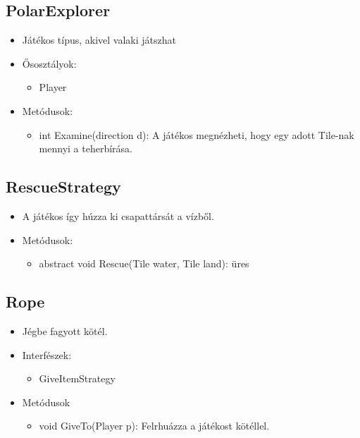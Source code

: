 \subsection{PolarExplorer}
\begin{itemize}
	\item Játékos típus, akivel valaki játszhat
	
	\item Ősosztályok:
	\begin{itemize}
		\item Player
	\end{itemize}

\item Metódusok:
\begin{itemize}
	\item int Examine(direction d): A játékos megnézheti, hogy egy adott Tile-nak mennyi a teherbírása.
\end{itemize}
\end{itemize}

\subsection{RescueStrategy}
\begin{itemize}
	\item A játékos így húzza ki csapattársát a vízből.\

\item Metódusok:
\begin{itemize}
	\item abstract void Rescue(Tile water, Tile land): üres
\end{itemize}
\end{itemize}

\subsection{Rope}
\begin{itemize}
	\item Jégbe fagyott kötél.
\item Interfészek:
\begin{itemize}
	\item GiveItemStrategy
\end{itemize}
\item Metódusok
\begin{itemize}
	\item void GiveTo(Player p): Felrhuázza a játékost kötéllel.
\end{itemize}
\end{itemize}

